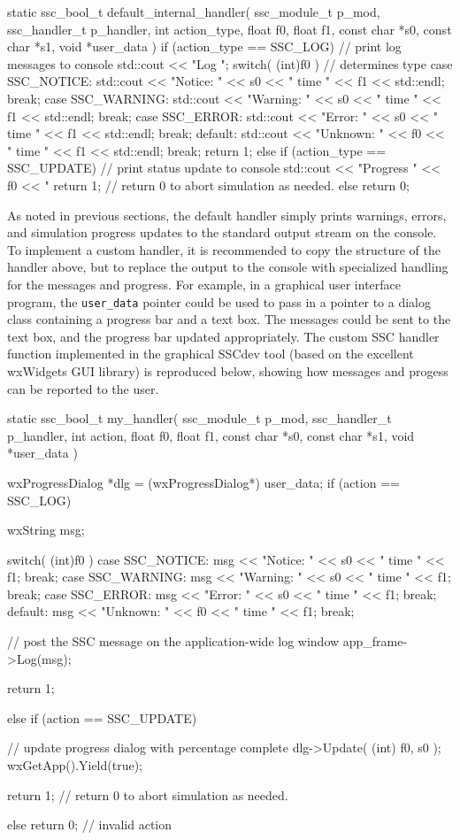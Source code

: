 \documentclass{article}
\begin{document}
\begin{verbatimtab}[4]
static ssc_bool_t default_internal_handler( ssc_module_t p_mod, ssc_handler_t p_handler,
	int action_type, float f0, float f1, 
	const char *s0, const char *s1,
	void *user_data )
{
	if (action_type == SSC_LOG)
	{
		// print log messages to console
		std::cout << "Log ";
		switch( (int)f0 ) // determines type
		{
		case SSC_NOTICE: 
			std::cout << "Notice: " << s0 << " time " << f1 << std::endl; 
			break;
		case SSC_WARNING: 
			std::cout << "Warning: " << s0 << " time " << f1 << std::endl; 
			break;
		case SSC_ERROR: 
			std::cout << "Error: " << s0 << " time " << f1 << std::endl; 
			break;
		default: 
			std::cout << "Unknown: " << f0 << " time " << f1 << std::endl; 
			break;
		}
		return 1;
	}
	else if (action_type == SSC_UPDATE)
	{
		// print status update to console
		std::cout << "Progress " << f0 << "%
		return 1; // return 0 to abort simulation as needed.
	}
	else
		return 0;
}
\end{verbatimtab}

As noted in previous sections, the default handler simply prints warnings, errors, and simulation progress updates to the standard output stream on the console.  To implement a custom handler, it is recommended to copy the structure of the handler above, but to replace the output to the console with specialized handling for the messages and progress.  For example, in a graphical user interface program, the \texttt{user\_data} pointer could be used to pass in a pointer to a dialog class containing a progress bar and a text box.  The messages could be sent to the text box, and the progress bar updated appropriately.  The custom SSC handler function implemented in the graphical SSCdev tool (based on the excellent wxWidgets GUI library) is reproduced below, showing how messages and progess can be reported to the user.

\begin{verbatimtab}[4]
static ssc_bool_t my_handler( ssc_module_t p_mod, ssc_handler_t p_handler, int action, 
	float f0, float f1, const char *s0, const char *s1, void *user_data )
{
	wxProgressDialog *dlg = (wxProgressDialog*) user_data;
	if (action == SSC_LOG)
	{
		wxString msg;

		switch( (int)f0 )
		{
		case SSC_NOTICE: msg << "Notice: " << s0 << " time " << f1; break;
		case SSC_WARNING: msg << "Warning: " << s0 << " time " << f1; break;
		case SSC_ERROR: msg << "Error: " << s0 << " time " << f1; break;
		default: msg << "Unknown: " << f0 << " time " << f1; break;
		}

		// post the SSC message on the application-wide log window 
		app_frame->Log(msg);

		return 1;
	}
	else if (action == SSC_UPDATE)
	{
 		// update progress dialog with percentage complete
		dlg->Update( (int) f0, s0 );
		wxGetApp().Yield(true);

		return 1; // return 0 to abort simulation as needed.
	}
	else
		return 0; // invalid action
}
\end{verbatimtab}
\end{document}
